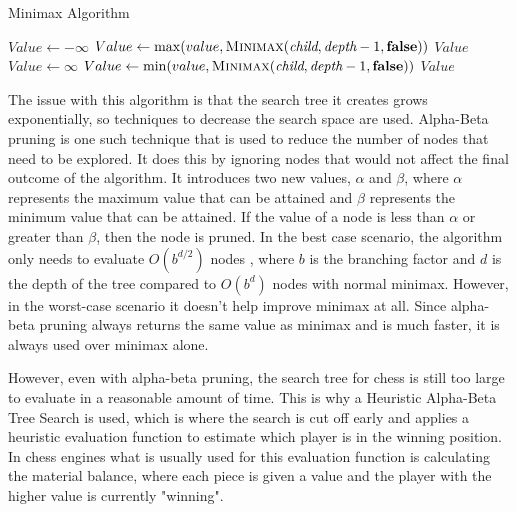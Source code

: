 \begin{algorithm}[h]
    \caption{Minimax Algorithm}
    \begin{algorithmic}
        \State \Return {}
        \EndIf
        \State $Value \gets -\infty$
        \State $Value \gets \max(value, \textsc{Minimax}(\textit{child}, \textit{depth} - 1, \textbf{false}))$
        \EndFor
        \State \Return $Value$
        \Else
        \State $Value \gets \infty$
        \State $Value \gets \min(value, \textsc{Minimax}(\textit{child}, \textit{depth} - 1, \textbf{false}))$
        \EndFor
        \State \Return $Value$
        \EndIf
        \EndFunction
    \end{algorithmic}
\end{algorithm}

The issue with this algorithm is that the search tree it creates grows exponentially, so techniques to decrease the search space are used. Alpha-Beta pruning is one such technique that is used to reduce the number of nodes that need to be explored. It does this by ignoring nodes that would not affect the final outcome of the algorithm. It introduces two new values, ${\alpha}$ and ${\beta}$, where ${\alpha}$ represents the maximum value that can be attained and ${\beta}$ represents the minimum value that can be attained. If the value of a node is less than ${\alpha}$ or greater than ${\beta}$, then the node is pruned. In the best case scenario, the algorithm only needs to evaluate ${O(b^{d/2})}$ nodes \cite{russellArtificialIntelligenceModern2022}, where ${b}$ is the branching factor and ${d}$ is the depth of the tree compared to ${O(b^d)}$ nodes with normal minimax. However, in the worst-case scenario it doesn't help improve minimax at all. Since alpha-beta pruning always returns the same value as minimax and is much faster, it is always used over minimax alone.

However, even with alpha-beta pruning, the search tree for chess is still too large to evaluate in a reasonable amount of time.  This is why a Heuristic Alpha-Beta Tree Search is used, which is where the search is cut off early and applies a heuristic evaluation function to estimate which player is in the winning position. In chess engines what is usually used for this evaluation function is calculating the material balance, where each piece is given a value and the player with the higher value is currently "winning".

